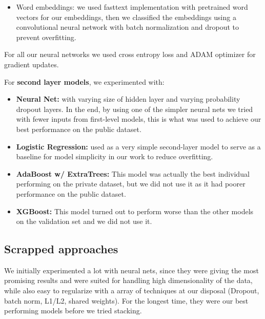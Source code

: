 \begin{itemize}
\begin{itemize}
                \begin{itemize}
                    \item Word embeddings: we used fasttext implementation with pretrained word vectors for our embeddings, then we classified the embeddings using a convolutional neural network with batch normalization and dropout to prevent overfitting.
                \end{itemize}
                For all our neural networks we used cross entropy loss and ADAM optimizer for gradient updates.
        \end{itemize}

        For \textbf{second layer models}, we experimented with:
        \begin{itemize}
            \item \textbf{Neural Net:} with varying size of hidden layer and varying probability dropout layers. In the end, by using one of the simpler neural nets we tried with fewer inputs from first-level models, this is what was used to achieve our best performance on the public dataset.
            \item \textbf{Logistic Regression:} used as a very simple second-layer model to serve as a baseline for model simplicity in our work to reduce overfitting.
            \item \textbf{AdaBoost w/ ExtraTrees:}
                This model was actually the best individual performing on the private dataset, but we did not use it as it had poorer performance on the public dataset.
            \item \textbf{XGBoost:} This model turned out to perform worse than the other models on the validation set and we did not use it.

        \end{itemize}

\end{itemize}

\subsection{Scrapped approaches}
We initially experimented a lot with neural nets, since they were giving the most promising results and were suited for handling high dimensionality of the data, while also easy to regularize with a array of techniques at our disposal (Dropout, batch norm, L1/L2, shared weights). For the longest time, they were our best performing models before we tried stacking.

